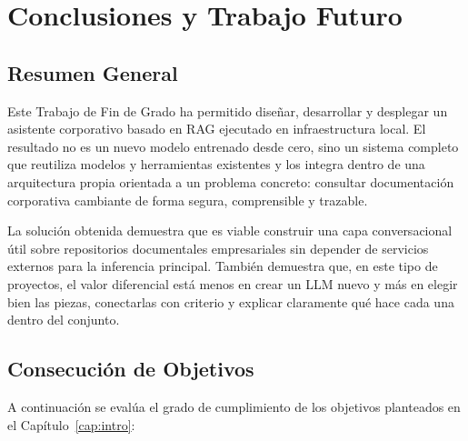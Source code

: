 \chapter{Conclusiones y Trabajo Futuro}
\label{cap:conclusiones}

\section{Resumen General}

Este Trabajo de Fin de Grado ha permitido diseñar, desarrollar y desplegar un asistente corporativo basado en RAG ejecutado en infraestructura local. El resultado no es un nuevo modelo entrenado desde cero, sino un sistema completo que reutiliza modelos y herramientas existentes y los integra dentro de una arquitectura propia orientada a un problema concreto: consultar documentación corporativa cambiante de forma segura, comprensible y trazable.

La solución obtenida demuestra que es viable construir una capa conversacional útil sobre repositorios documentales empresariales sin depender de servicios externos para la inferencia principal. También demuestra que, en este tipo de proyectos, el valor diferencial está menos en crear un LLM nuevo y más en elegir bien las piezas, conectarlas con criterio y explicar claramente qué hace cada una dentro del conjunto.

\section{Consecución de Objetivos}

A continuación se evalúa el grado de cumplimiento de los objetivos planteados en el Capítulo~\ref{cap:intro}:

